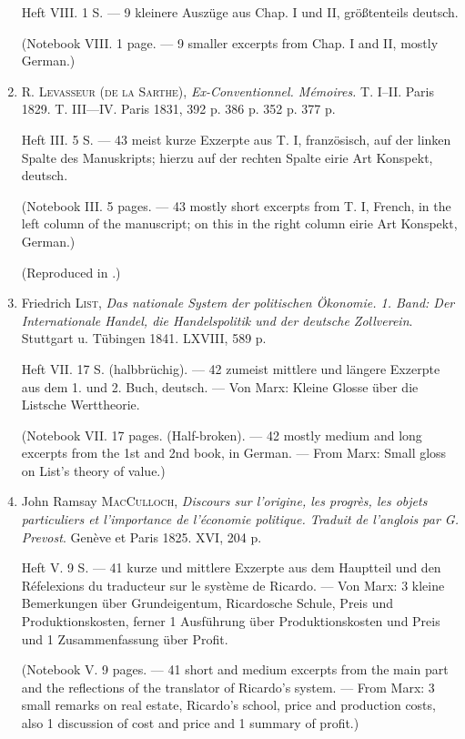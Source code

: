 \begin{enumerate}
    Heft VIII. 1 S. --- 9 kleinere Auszüge aus Chap. I und II, größtenteils deutsch.
    
    (Notebook VIII. 1 page. --- 9 smaller excerpts from Chap. I and II, mostly German.)
    
    \item R. \textsc{Levasseur (de la Sarthe)}, \textit{Ex-Conventionnel. Mémoires.} T. I--II. Paris 1829. T. III—IV. Paris 1831, 392 p. 386 p. 352 p. 377 p.
    
    Heft III. 5 S. --- 43 meist kurze Exzerpte aus T. I, französisch, auf der linken Spalte des Manuskripts; hierzu auf der rechten Spalte eirie Art Konspekt, deutsch.
    
    (Notebook III. 5 pages. --- 43 mostly short excerpts from T. I, French, in the left column of the manuscript; on this in the right column eirie Art Konspekt, German.)
    
    (Reproduced in .)
    
    \item Friedrich \textsc{List}, \textit{Das nationale System der politischen Ökonomie. 1. Band: Der Internationale Handel, die Handelspolitik und der deutsche Zollverein}. Stuttgart u. Tübingen 1841. LXVIII, 589 p.
    
    Heft VII. 17 S. (halbbrüchig). --- 42 zumeist mittlere und längere Exzerpte aus dem 1. und 2. Buch, deutsch. --- Von Marx: Kleine Glosse über die Listsche Werttheorie.
    
    (Notebook VII. 17 pages. (Half-broken). --- 42 mostly medium and long excerpts from the 1st and 2nd book, in German. --- From Marx: Small gloss on List's theory of value.)
    
    \item John Ramsay \textsc{MacCulloch}, \textit{Discours sur l'origine, les progrès, les objets particuliers et l'importance de l'économie politique. Traduit de l'anglois par G. Prevost}. Genève et Paris 1825. XVI, 204 p.
    
    Heft V. 9 S. --- 41 kurze und mittlere Exzerpte aus dem Hauptteil und den Réfelexions du traducteur sur le système de Ricardo. --- Von Marx: 3 kleine Bemerkungen über Grundeigentum, Ricardosche Schule, Preis und Produktionskosten, ferner 1 Ausführung über Produktionskosten und Preis und 1 Zusammenfassung über Profit.
    
    (Notebook V. 9 pages. --- 41 short and medium excerpts from the main part and the reflections of the translator of Ricardo's system. --- From Marx: 3 small remarks on real estate, Ricardo's school, price and production costs, also 1 discussion of cost and price and 1 summary of profit.)
    

\end{enumerate}
